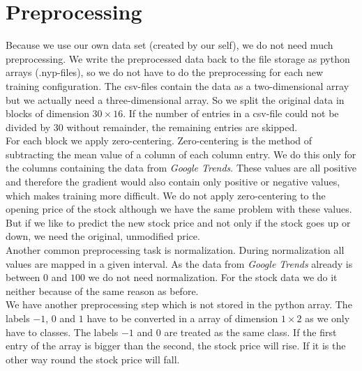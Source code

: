 \section{Preprocessing}
\label{sec:preprocessing}
Because we use our own data set (created by our self), we do not need much preprocessing. We write the preprocessed data back to the file storage as python arrays (.nyp-files), so we do not have to do the preprocessing for each new training configuration. The csv-files contain the data as a two-dimensional array but we actually need a three-dimensional array. So we split the original data in blocks of dimension $30 \times 16$. If the number of entries in a csv-file could not be divided by 30 without remainder, the remaining entries are skipped.\\
For each block we apply zero-centering. Zero-centering is the method of subtracting the mean value of a column of each column entry. We do this only for the columns containing the data from \textit{Google Trends}. These values are all positive and therefore the gradient would also contain only positive or negative values, which makes training more difficult. We do not apply zero-centering to the opening price of the stock although we have the same problem with these values. But if we like to predict the new stock price and not only if the stock goes up or down, we need the original, unmodified price.\\
Another common preprocessing task is normalization. During normalization all values are mapped in a given interval. As the data from \textit{Google Trends} already is between $0$ and $100$ we do not need normalization. For the stock data we do it neither because of the same reason as before.\\
We have another preprocessing step which is not stored in the python array. The labels $-1$, $0$ and $1$ have to be converted in a array of dimension $1 \times 2$ as we only have to classes. The labels $-1$ and $0$ are treated as the same class. If the first entry of the array is bigger than the second, the stock price will rise. If it is the other way round the stock price will fall.